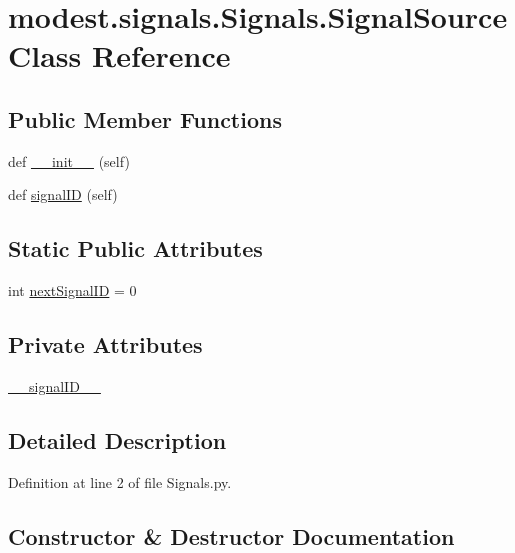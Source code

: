 \hypertarget{classmodest_1_1signals_1_1Signals_1_1SignalSource}{}\section{modest.\+signals.\+Signals.\+Signal\+Source Class Reference}
\label{classmodest_1_1signals_1_1Signals_1_1SignalSource}
\subsection*{Public Member Functions}
\begin{DoxyCompactItemize}
\item 
def \hyperlink{classmodest_1_1signals_1_1Signals_1_1SignalSource_a0315f32e346f2fde67662f58988a75b7}{\+\_\+\+\_\+init\+\_\+\+\_\+} (self)
\item 
def \hyperlink{classmodest_1_1signals_1_1Signals_1_1SignalSource_a5854ef99190d02a95e0046b195a0949b}{signal\+ID} (self)
\end{DoxyCompactItemize}
\subsection*{Static Public Attributes}
\begin{DoxyCompactItemize}
\item 
int \hyperlink{classmodest_1_1signals_1_1Signals_1_1SignalSource_a58350fc8dfea4228a81fa469fc2305b3}{next\+Signal\+ID} = 0
\end{DoxyCompactItemize}
\subsection*{Private Attributes}
\begin{DoxyCompactItemize}
\item 
\hyperlink{classmodest_1_1signals_1_1Signals_1_1SignalSource_a3afbfc4131c4f3472589a7d8f55aae2c}{\+\_\+\+\_\+signal\+I\+D\+\_\+\+\_\+}
\end{DoxyCompactItemize}


\subsection{Detailed Description}


Definition at line 2 of file Signals.\+py.



\subsection{Constructor \& Destructor Documentation}
